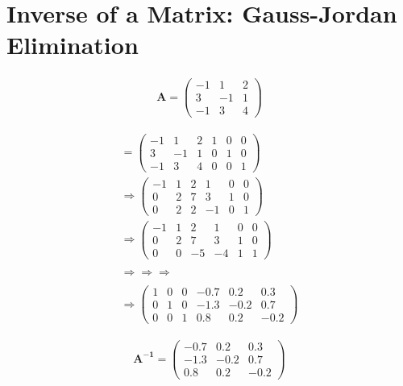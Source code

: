 \section{Inverse of a Matrix: Gauss-Jordan Elimination}
\begin{myExample}
	\begin{eqnarray*}
		\mathbf{A}=
		\begin{pmatrix}
			-1 & 1 & 2\\
			3 & -1 & 1\\
			-1 & 3 & 4
		\end{pmatrix}
	\end{eqnarray*}
	
	\begin{eqnarray*}
		[\mathbf{A}\cdot \mathbf{I}]=
		\begin{pmatrix}
			-1 & 1 & 2 & 1 & 0 & 0\\
			3 & -1 & 1 & 0 & 1 & 0\\
			-1 & 3 & 4 & 0 & 0 & 1
		\end{pmatrix}
		\\
		\Rightarrow
		\begin{pmatrix}
			-1 & 1 & 2 & 1 & 0 & 0\\
			0 & 2 & 7 & 3 & 1 & 0\\
			0 & 2 & 2 & -1 & 0 & 1
		\end{pmatrix}
		\\
		\Rightarrow
		\begin{pmatrix}
			-1 & 1 & 2 & 1 & 0 & 0\\
			0 & 2 & 7 & 3 & 1 & 0\\
			0 & 0 & -5 & -4 & 1 & 1
		\end{pmatrix}
		\\\\
		\Rightarrow \Rightarrow \Rightarrow
		\\\\
		\Rightarrow
		\begin{pmatrix}
			1 & 0 & 0 & -0.7 & 0.2 & 0.3\\
			0 & 1 & 0 & -1.3 & -0.2 & 0.7\\
			0 & 0 & 1 & 0.8 & 0.2 & -0.2
		\end{pmatrix}
	\end{eqnarray*}
	
	\begin{eqnarray*}
		\mathbf{A^{-1}}=\begin{pmatrix}
			 -0.7 & 0.2 & 0.3\\
			 -1.3 & -0.2 & 0.7\\
			 0.8 & 0.2 & -0.2
		\end{pmatrix}
	\end{eqnarray*}
\end{myExample}
